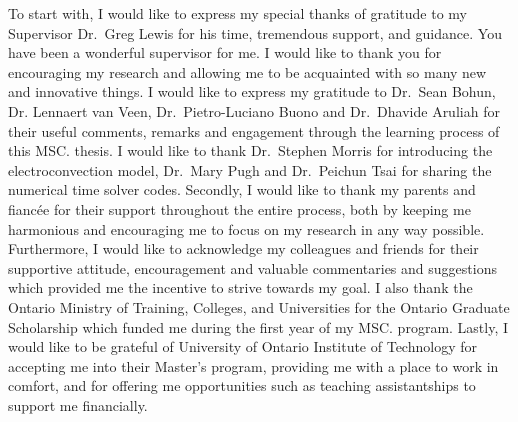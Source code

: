\cleardoublepage


To start with, I would like to express my special thanks of gratitude to my Supervisor Dr.\ Greg Lewis for his time, tremendous support, and guidance. You have been a wonderful supervisor for me. I would like to thank you for encouraging my research and allowing me to be acquainted with so many new and innovative things.
I would like to express my gratitude to Dr.\ Sean Bohun, Dr. Lennaert van Veen, Dr.\ Pietro-Luciano Buono and Dr.\ Dhavide Aruliah for their useful comments, remarks and engagement through the learning process of this MSC. thesis. I would like to thank Dr.\ Stephen Morris for introducing the electroconvection model, Dr.\ Mary Pugh and Dr.\ Peichun  Tsai for sharing the numerical time solver codes.
Secondly, I would like to thank my parents and fianc\'ee for their support throughout the entire process, both by keeping me harmonious and encouraging me to focus on my research in any way possible.
Furthermore, I would like to acknowledge my colleagues and friends for their supportive attitude, encouragement and valuable commentaries and suggestions which provided me the incentive to strive towards my goal. I also thank the Ontario Ministry of Training, Colleges, and Universities for the Ontario Graduate Scholarship which funded me during the first year of my MSC. program.
Lastly, I would like to be grateful of University of Ontario Institute of Technology for accepting me into their Master’s program, providing me with a place to work in comfort, and for offering me opportunities such as teaching assistantships to support me financially.



\declarationpage


\contents

\afterpreliminaries

